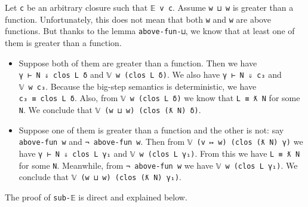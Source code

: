 \begin{itemize}
  Let \texttt{c} be an arbitrary closure such that \texttt{𝔼\ v\ c}.
  Assume \texttt{w\ ⊔\ w\textquotesingle{}} is greater than a function.
  Unfortunately, this does not mean that both \texttt{w} and
  \texttt{w\textquotesingle{}} are above functions. But thanks to the
  lemma \texttt{above-fun-⊔}, we know that at least one of them is
  greater than a function.

  \begin{itemize}
  \item
    Suppose both of them are greater than a function. Then we have
    \texttt{γ\ ⊢\ N\ ⇓\ clos\ L\ δ} and \texttt{𝕍\ w\ (clos\ L\ δ)}. We
    also have \texttt{γ\ ⊢\ N\ ⇓\ c₃} and
    \texttt{𝕍\ w\textquotesingle{}\ c₃}. Because the big-step semantics
    is deterministic, we have \texttt{c₃\ ≡\ clos\ L\ δ}. Also, from
    \texttt{𝕍\ w\ (clos\ L\ δ)} we know that
    \texttt{L\ ≡\ ƛ\ N\textquotesingle{}} for some
    \texttt{N\textquotesingle{}}. We conclude that
    \texttt{𝕍\ (w\ ⊔\ w\textquotesingle{})\ (clos\ (ƛ\ N\textquotesingle{})\ δ)}.
  \item
    Suppose one of them is greater than a function and the other is not:
    say \texttt{above-fun\ w} and
    \texttt{¬\ above-fun\ w\textquotesingle{}}. Then from
    \texttt{𝕍\ (v\ ↦\ w)\ (clos\ (ƛ\ N)\ γ)} we have
    \texttt{γ\ ⊢\ N\ ⇓\ clos\ L\ γ₁} and \texttt{𝕍\ w\ (clos\ L\ γ₁)}.
    From this we have \texttt{L\ ≡\ ƛ\ N\textquotesingle{}} for some
    \texttt{N\textquotesingle{}}. Meanwhile, from
    \texttt{¬\ above-fun\ w\textquotesingle{}} we have
    \texttt{𝕍\ w\textquotesingle{}\ (clos\ L\ γ₁)}. We conclude that
    \texttt{𝕍\ (w\ ⊔\ w\textquotesingle{})\ (clos\ (ƛ\ N\textquotesingle{})\ γ₁)}.
  \end{itemize}
\end{itemize}

The proof of \texttt{sub-𝔼} is direct and explained below.

